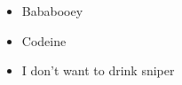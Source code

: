 \documentclass{article}
\begin{document}
	
	\begin{itemize}
		\item Bababooey
		\item Codeine
		\item I don't want to drink sniper
	\end{itemize}
\end{document}
